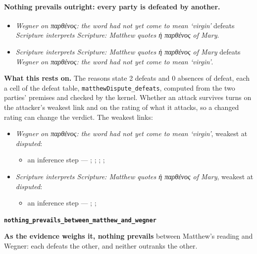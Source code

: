 \documentclass[11pt]{article}
\begin{document}
\paragraph{Nothing prevails outright: every party is defeated by another.}
\begin{itemize}
\item \emph{Wegner on παρθένος: the word had not yet come to mean ‘virgin’} defeats \emph{Scripture interprets Scripture: Matthew quotes ἡ παρθένος of Mary}.
\item \emph{Scripture interprets Scripture: Matthew quotes ἡ παρθένος of Mary} defeats \emph{Wegner on παρθένος: the word had not yet come to mean ‘virgin’}.
\end{itemize}
\par\noindent\textbf{What this rests on.} The reasons state 2 defeats and 0 absences of defeat, each a cell of the defeat table, \texttt{matthew\allowbreak{}Dispute\_\allowbreak{}defeats}, computed from the two parties' premises and checked by the kernel. Whether an attack survives turns on the attacker's weakest link and on the rating of what it attacks, so a changed rating can change the verdict. The weakest links:
\begin{itemize}
\item \emph{Wegner on παρθένος: the word had not yet come to mean ‘virgin’}, weakest at \emph{disputed}:
\begin{itemize}
\item an inference step --- \cite[482--483]{wegner-virgin-births-2011}; \cite[67]{rhodea-did-matthew-conceive-2013}; \cite{meade-ancient-versions-comment-2013}; \cite[18--21]{rico-gentry-infant-king-2020}; \cite[112--113]{bratcher-study-of-isaiah-1958}
\end{itemize}
\item \emph{Scripture interprets Scripture: Matthew quotes ἡ παρθένος of Mary}, weakest at \emph{disputed}:
\begin{itemize}
\item an inference step --- \cite[I.ix]{westminster-confession-1647}; \cite[III.21.3]{irenaeus-against-heresies-180}; \cite[483]{wegner-virgin-births-2011}
\end{itemize}
\end{itemize}
\par\medskip\noindent\textbf{\texttt{nothing\_\allowbreak{}prevails\_\allowbreak{}between\_\allowbreak{}matthew\_\allowbreak{}and\_\allowbreak{}wegner}}\par\nobreak\noindent
\textbf{As the evidence weighs it, nothing prevails} between Matthew’s reading and Wegner: each defeats the other, and neither outranks the other.
\end{document}
